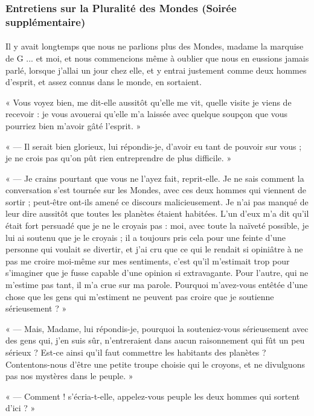 \documentclass[a4paper, 11pt, oneside]{article}
\begin{document}
\subsubsection{Entretiens sur la Pluralité des Mondes (Soirée supplémentaire)}
\paragraph{}
Il y avait longtemps que nous ne parlions plus des Mondes, madame la marquise de G ... et moi, et nous commencions même à oublier que nous en eussions jamais parlé, lorsque j'allai un jour chez elle, et y entrai justement comme deux hommes d'esprit, et assez connus dans le monde, en sortaient.

« Vous voyez bien, me dit-elle aussitôt qu'elle me vit, quelle visite je viens de recevoir : je vous avouerai qu'elle m'a laissée avec quelque soupçon que vous pourriez bien m'avoir gâté l'esprit. »

« --- Il serait bien glorieux, lui répondis-je, d'avoir eu tant de pouvoir sur vous ; je ne crois pas qu'on pût rien entreprendre de plus difficile. »

« --- Je crains pourtant que vous ne l'ayez fait, reprit-elle. Je ne sais comment la conversation s'est tournée sur les Mondes, avec ces deux hommes qui viennent de sortir ; peut-être ont-ils amené ce discours malicieusement. Je n'ai pas manqué de leur dire aussitôt que toutes les planètes étaient habitées. L'un d'eux m'a dit qu'il était fort persuadé que je ne le croyais pas : moi, avec toute la naïveté possible, je lui ai soutenu que je le croyais ; il a toujours pris cela pour une feinte d'une personne qui voulait se divertir, et j'ai cru que ce qui le rendait si opiniâtre à ne pas me croire moi-même sur mes sentiments, c'est qu'il m'estimait trop pour s'imaginer que je fusse capable d'une opinion si extravagante. Pour l'autre, qui ne m'estime pas tant, il m'a crue sur ma parole. Pourquoi m'avez-vous entêtée d'une chose que les gens qui m'estiment ne peuvent pas croire que je soutienne sérieusement ? »

« --- Mais, Madame, lui répondis-je, pourquoi la souteniez-vous sérieusement avec des gens qui, j'en suis sûr, n'entreraient dans aucun raisonnement qui fût un peu sérieux ? Est-ce ainsi qu'il faut commettre les habitants des planètes ? Contentons-nous d'être une petite troupe choisie qui le croyons, et ne divulguons pas nos mystères dans le peuple. »

« --- Comment ! s'écria-t-elle, appelez-vous peuple les deux hommes qui sortent d'ici ? »
\end{document}
